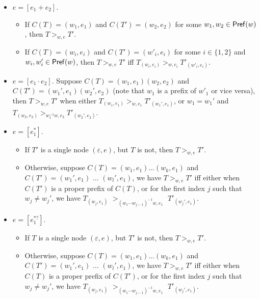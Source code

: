 \begin{definition}
\begin{itemize}
  		\item $e = [e_1 + e_2]$.
  		\begin{itemize}
  			\item If $C (T) = (w_1, e_1)$ and $C (T') = (w_2, e_2)$ for some $w_1, w_2 \in \mathsf{Pref}(w)$, then $T >_{w,e} T'$.
%  			
  			\item If $C (T) = (w_i, e_i)$ and $C (T') = (w'_i, e_i)$ for some $i \in \{ 1,
  			2 \}$ and $w_i, w'_i \in \mathsf{Pref}(w)$, then $T >_{w,e} T'$ iff $T_{(w_i, e_i)} >_{w, e_i} T'_{(w'_i, e_i)}$.
  		\end{itemize}
  		\item $e = [e_1 \cdot e_2]$. Suppose $C (T) = (w_1, e_1) (w_2, e_2)$ and $C (T') =
  		(w_1', e_1) (w_2', e_2)$ (note that $w_1$ is a prefix of $w'_1$ or vice versa), then $T >_{w,e} T'$ when either $T_{(w_1, e_1)} >_{w, e_1}
  		T'_{(w_1', e_1)}$, or $w_1 = w_1'$ and $T_{(w_2, e_2)} >_{w_1^{-1}w, e_2} T'_{(w_2', e_2)}$. 
%  		
  		\item $e = [e_1^{\ast}]$. 
		\begin{itemize}
		\item If $T' $ is  a single node $(\varepsilon, e)$, but $T$ is not, then $T >_{w, e} T'$.
  		\item Otherwise, suppose $C(T) = (w_1, e_1) \ldots (w_k, e_1)$ and $C (T') =
  		(w_1', e_1)$ $\ldots$ $(w_l', e_1)$, we have $T >_{w,e} T'$ iff either when $C (T')$
  		is a proper prefix of $C (T)$, or for the first index $j$ such that $w_j
  		\neq w_j'$, we have $T_{(w_j, e_1)}$ $>_{(w_1\cdots w_{j-1})^{-1}w, e_1}$ $T'_{(w_j', e_1)}$.
		\end{itemize}
%
  		\item $e = [e_1^{\ast?}]$. 
		\begin{itemize}
		\item If $T$ is  a single node  $(\varepsilon, e)$, but $T'$ is not, then $T >_{w, e} T'$.
  		\item Otherwise, suppose $C(T) = (w_1, e_1) \ldots (w_k, e_1)$ and $C (T') =
  		(w_1', e_1)$ $\ldots$ $(w_l', e_1)$, we have $T >_{w,e} T'$ iff either when $C (T)$
  		is a proper prefix of $C (T')$, or for the first index $j$ such that $w_j
  		\neq w_j'$, we have $T_{(w_j, e_1)}$ $>_{(w_1\cdots w_{j-1})^{-1}w, e_1}$ $T'_{(w_j', e_1)}$.
		\end{itemize}
  	\end{itemize}
  	

\end{definition}
